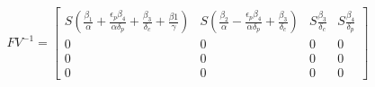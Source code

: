\documentclass[preview]{standalone}
\begin{document}
\begin{align*}
FV^{-1} = \begin{bmatrix} S ( \frac{\beta_1}{\alpha} + \frac{\epsilon_p \beta_4}{\alpha \delta_p} + \frac{\beta_3}{\delta_c} + \frac{\beta1}{\gamma} ) & S (\frac{\beta_2}{\alpha} - \frac{\epsilon_p \beta_4}{\alpha \delta_p} + \frac{\beta_3}{\delta_c}) & S \frac{\beta_3}{\delta_c} & S \frac{\beta_4}{\delta_p} \\ 0 & 0 & 0 & 0 \\ 0 & 0 & 0 & 0 \\ 0 & 0 & 0 & 0 \end{bmatrix}
\end{align*}
\end{document}
